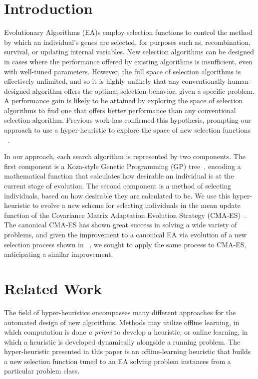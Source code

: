 \documentclass[sigconf]{acmart}
\begin{document}
\section{Introduction}
\label{Introduction}
Evolutionary Algorithms (EA)s employ selection functions to control the method by which an individual's genes are selected, for purposes such as, recombination, survival, or updating internal variables. New selection algorithms can be designed in cases where the performance offered by existing algorithms is insufficient, even with well-tuned parameters. However, the full space of selection algorithms is effectively unlimited, and so it is highly unlikely that any conventionally human-designed algorithm offers the optimal selection behavior, given a specific problem. A performance gain is likely to be attained by exploring the space of selection algorithms to find one that offers better performance than any conventional selection algorithm. Previous work has confirmed this hypothesis, prompting our approach to use a hyper-heuristic to explore the space of new selection functions ~\citep{woodward2011selection}.

In our approach, each search algorithm is represented by two components. The first component is a Koza-style Genetic Programming (GP) tree~\citep{koza1994genetic}, encoding a mathematical function that calculates how desirable an individual is at the current stage of evolution. The second component is a method of selecting individuals, based on how desirable they are calculated to be. We use this hyper-heuristic to evolve a new scheme for selecting individuals in the mean update function of the Covariance Matrix Adaptation Evolution Strategy (CMA-ES)~\citep{hansen1996cmaes}. The canonical CMA-ES has shown great success in solving a wide variety of problems, and given the improvement to a canonical EA via evolution of a new selection process shown in ~\citep{richter2018adpsea}, we sought to apply the same process to CMA-ES, anticipating a similar improvement.

\section{Related Work}
\label{Literature Review}
The field of hyper-heuristics encompasses many different approaches for the automated design of new algorithms. Methods may utilize offline learning, in which computation is done \textit{a priori} to develop a heuristic, or online learning, in which a heuristic is developed dynamically alongside a running problem. The hyper-heuristic presented in this paper is an offline-learning heuristic that builds a new selection function tuned to an EA solving problem instances from a particular problem class.
\end{document}
